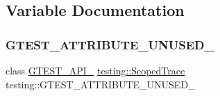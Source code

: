 \subsection{Variable Documentation}
\mbox{\label{namespacetesting_ada49f71f486d52155b86702a570f7fcb}} 
\subsubsection{\texorpdfstring{GTEST\_ATTRIBUTE\_UNUSED\_}{GTEST\_ATTRIBUTE\_UNUSED\_}}
{\footnotesize\ttfamily class \mbox{\hyperlink{_obj__test_2lib_2googletest-release-1_88_81_2googletest_2include_2gtest_2internal_2gtest-port_8h_aa73be6f0ba4a7456180a94904ce17790}{G\+T\+E\+S\+T\+\_\+\+A\+P\+I\+\_\+}} \mbox{\hyperlink{classtesting_1_1_scoped_trace}{testing\+::\+Scoped\+Trace}} testing\+::\+G\+T\+E\+S\+T\+\_\+\+A\+T\+T\+R\+I\+B\+U\+T\+E\+\_\+\+U\+N\+U\+S\+E\+D\+\_\+}

